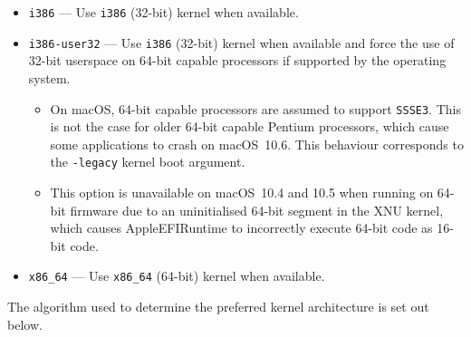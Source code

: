 \documentclass[]{article}
\providecommand{\tightlist}{%
  \setlength{\itemsep}{0pt}\setlength{\parskip}{0pt}}
\begin{document}
\begin{enumerate}
  \begin{itemize}
    \tightlist
    \item \texttt{i386} --- Use \texttt{i386} (32-bit) kernel when available.
    \item \texttt{i386-user32} --- Use \texttt{i386} (32-bit) kernel when available
      and force the use of 32-bit userspace on 64-bit capable processors if supported
      by the operating system.
      \begin{itemize}
        \tightlist
        \item On macOS, 64-bit capable processors are assumed to
          support \texttt{SSSE3}. This is not the case for older 64-bit capable Pentium
          processors, which cause some applications to crash on macOS~10.6. This behaviour
          corresponds to the \texttt{-legacy} kernel boot argument.
        \item This option is unavailable on macOS~10.4 and 10.5 when running on 64-bit firmware
          due to an uninitialised 64-bit segment in the XNU kernel, which causes AppleEFIRuntime
          to incorrectly execute 64-bit code as 16-bit code.
      \end{itemize}
    \item \texttt{x86\_64} --- Use \texttt{x86\_64} (64-bit) kernel when available.
  \end{itemize}

  The algorithm used to determine the preferred kernel architecture is set out below.


\end{enumerate}
\end{document}
